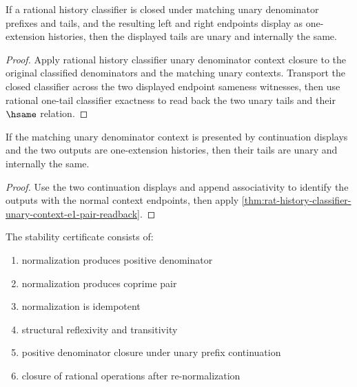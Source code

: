\begin{theorem}
\label{thm:rat-history-classifier-unary-context-e1-pair-readback}
If a rational history classifier is closed under matching unary denominator prefixes and tails, and the resulting left and right endpoints display as one-extension histories, then the displayed tails are unary and internally the same.
\end{theorem}
\begin{proof}
Apply rational history classifier unary denominator context closure to the original classified denominators and the matching unary contexts. Transport the closed classifier across the two displayed endpoint sameness witnesses, then use rational one-tail classifier exactness to read back the two unary tails and their $\hsame$ relation.
\end{proof}

\begin{theorem}
\label{thm:rat-history-classifier-cont-unary-context-e1-pair-readback}
If the matching unary denominator context is presented by continuation
displays and the two outputs are one-extension histories, then their tails are
unary and internally the same.
\end{theorem}
\begin{proof}
Use the two continuation displays and append associativity to identify the
outputs with the normal context endpoints, then apply
\autoref{thm:rat-history-classifier-unary-context-e1-pair-readback}.
\end{proof}

\begin{definition}
\label{def:rat-stability-certificate}
The stability certificate consists of:
\begin{enumerate}
  \item normalization produces positive denominator
  \item normalization produces coprime pair
  \item normalization is idempotent
  \item structural reflexivity and transitivity
  \item positive denominator closure under unary prefix continuation
  \item closure of rational operations after re-normalization
\end{enumerate}
\end{definition}

